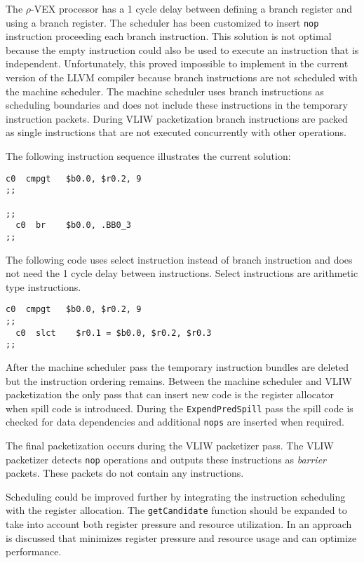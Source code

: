 The $\rho$-VEX processor has a 1 cycle delay between defining a branch register and using a branch register. The scheduler has been customized to insert \texttt{nop} instruction proceeding each branch instruction. This solution is not optimal because the empty instruction could also be used to execute an instruction that is independent. Unfortunately, this proved impossible to implement in the current version of the LLVM compiler because branch instructions are not scheduled with the machine scheduler. The machine scheduler uses branch instructions as scheduling boundaries and does not include these instructions in the temporary instruction packets. During VLIW packetization branch instructions are packed as single instructions that are not executed concurrently with other operations.

The following instruction sequence illustrates the current solution: 
\newpage

\begin{lstlisting}[language=rvex]
  c0  cmpgt   $b0.0, $r0.2, 9
;;

;;
  c0  br    $b0.0, .BB0_3
;;
\end{lstlisting}

The following code uses select instruction instead of branch instruction and does not need the 1 cycle delay between instructions. Select instructions are arithmetic type instructions.

\begin{lstlisting}[language=rvex]
  c0  cmpgt   $b0.0, $r0.2, 9
;;
  c0  slct    $r0.1 = $b0.0, $r0.2, $r0.3 
;;
\end{lstlisting}

After the machine scheduler pass the temporary instruction bundles are deleted but the instruction ordering remains. Between the machine scheduler and VLIW packetization the only pass that can insert new code is the register allocator when spill code is introduced. During the \texttt{ExpendPredSpill} pass the spill code is checked for data dependencies and additional \texttt{nops} are inserted when required.

The final packetization occurs during the VLIW packetizer pass. The VLIW packetizer detects \texttt{nop} operations and outputs these instructions as \emph{barrier} packets. These packets do not contain any instructions.

Scheduling could be improved further by integrating the instruction scheduling with the register allocation. The \texttt{getCandidate} function should be expanded to take into account both register pressure and resource utilization. In \cite{Bradlee:1991:IRA:106973.106986} an approach is discussed that minimizes register pressure and resource usage and can optimize performance.

